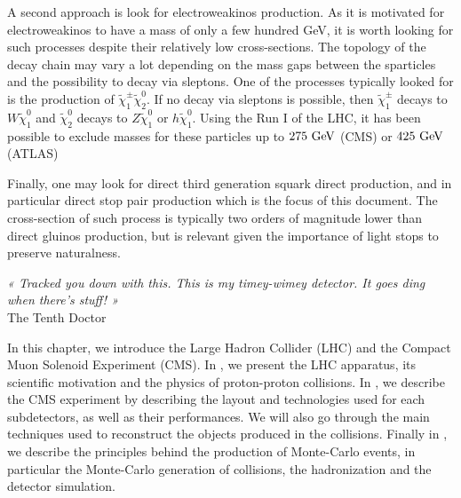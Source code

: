         A second approach is look for electroweakinos production. As it is motivated for
        electroweakinos to have a mass of only a few hundred GeV, it is worth looking for
        such processes despite their relatively low cross-sections. The topology of the
        decay chain may vary a lot depending on the mass gaps between the sparticles and
        the possibility to decay via sleptons. One of the processes typically looked for
        is the production of $\tilde{\chi}_1^\pm \tilde{\chi}_2^0$. If no decay via sleptons
        is possible, then $\tilde{\chi}_1^\pm$ decays to $W \tilde{\chi}_1^0$ and $\tilde{\chi}_2^0$
        decays to $Z \tilde{\chi}_1^0$ or $h \tilde{\chi}_1^0$. Using the Run I of the LHC, it has been possible
        to exclude masses for these particles up to $275~\text{GeV}$ (CMS) or $425~\text{GeV}$ (ATLAS)

        Finally, one may look for direct third generation squark direct production,
        and in particular direct stop pair production which is the focus of this document.
        The cross-section of such process is typically two orders of magnitude lower than
        direct gluinos production, but is relevant given the importance of light stops to
        preserve naturalness.

\setcounter{mtc}{3}
\vspace*{-0.7cm}
\hspace*{0.39\textwidth}
\begin{minipage}{0.6\textwidth}
\emph{« Tracked you down with this. This is my timey-wimey detector. It goes ding when there’s stuff! »}\\
\hspace*{0.6\textwidth} The Tenth Doctor
\end{minipage}
\minitoc
\newpage

    In this chapter, we introduce the Large Hadron Collider (LHC) and the Compact Muon Solenoid
    Experiment (CMS). In , we present the LHC apparatus,
    its scientific motivation and the physics of proton-proton collisions. In ,
    we describe the CMS experiment by describing the layout and technologies used for each
    subdetectors, as well as their performances. We will also go through the main techniques
    used to reconstruct the objects produced in the collisions. Finally in ,
    we describe the principles behind the production of Monte-Carlo events, in particular
    the Monte-Carlo generation of collisions, the hadronization and the detector simulation.

